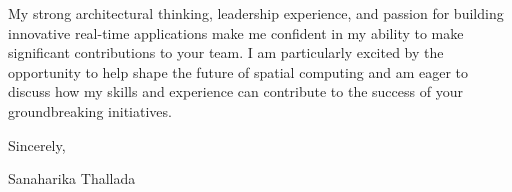 \documentclass[letterpaper,11pt]{article}
\begin{document}
My strong architectural thinking, leadership experience, and passion for building innovative real-time applications make me confident in my ability to make significant contributions to your team.  I am particularly excited by the opportunity to help shape the future of spatial computing and am eager to discuss how my skills and experience can contribute to the success of your groundbreaking initiatives.


Sincerely,

Sanaharika Thallada
\end{document}
